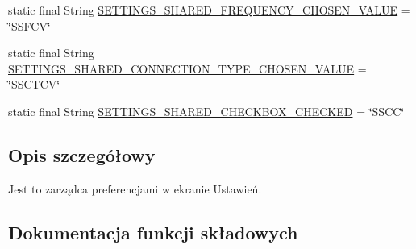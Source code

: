 \begin{DoxyCompactItemize}
static final String \hyperlink{classpl_1_1edu_1_1uwb_1_1mobiuwb_1_1view_1_1settings_1_1_settings_preferences_manager_a2a0f77158728fad4ae9b1f01c05ae34f}{S\+E\+T\+T\+I\+N\+G\+S\+\_\+\+S\+H\+A\+R\+E\+D\+\_\+\+F\+R\+E\+Q\+U\+E\+N\+C\+Y\+\_\+\+C\+H\+O\+S\+E\+N\+\_\+\+V\+A\+L\+U\+E} = \char`\"{}S\+S\+F\+C\+V\char`\"{}
\item 
static final String \hyperlink{classpl_1_1edu_1_1uwb_1_1mobiuwb_1_1view_1_1settings_1_1_settings_preferences_manager_a5730a89005e6e6835644cd939e784aac}{S\+E\+T\+T\+I\+N\+G\+S\+\_\+\+S\+H\+A\+R\+E\+D\+\_\+\+C\+O\+N\+N\+E\+C\+T\+I\+O\+N\+\_\+\+T\+Y\+P\+E\+\_\+\+C\+H\+O\+S\+E\+N\+\_\+\+V\+A\+L\+U\+E} = \char`\"{}S\+S\+C\+T\+C\+V\char`\"{}
\item 
static final String \hyperlink{classpl_1_1edu_1_1uwb_1_1mobiuwb_1_1view_1_1settings_1_1_settings_preferences_manager_aa36424739ed51a49edd0cd3d50cc2adf}{S\+E\+T\+T\+I\+N\+G\+S\+\_\+\+S\+H\+A\+R\+E\+D\+\_\+\+C\+H\+E\+C\+K\+B\+O\+X\+\_\+\+C\+H\+E\+C\+K\+E\+D} = \char`\"{}S\+S\+C\+C\char`\"{}
\end{DoxyCompactItemize}


\subsection{Opis szczegółowy}
Jest to zarządca preferencjami w ekranie Ustawień. 

\subsection{Dokumentacja funkcji składowych}
\hypertarget{classpl_1_1edu_1_1uwb_1_1mobiuwb_1_1view_1_1settings_1_1_settings_preferences_manager_abc0a86bdc9bb50200f33dc177824d3be}{}
